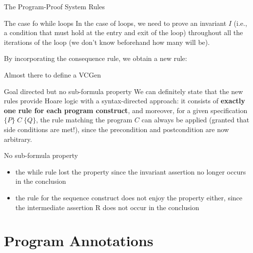 \documentclass[aspectratio=169]{beamer}
\begin{document}
\begin{frame}[fragile]{The Program-Proof System Rules}
  \begin{block}{The case fo while loops}
  In the case of loops, we need to prove an invariant $I$ (i.e., a condition that must hold at the entry and exit of the loop) throughout all the iterations of the loop (we don't know beforehand how many will be). 
    \begin{prooftree}
    \end{prooftree}
    By incorporating the consequence rule, we obtain a new rule:
    \begin{prooftree}
    \end{prooftree}
  \end{block}
\end{frame}

\begin{slide}{Almost there to define a VCGen}
  \begin{block}{Goal directed but no sub-formula property}
    We can definitely state that the new rules provide Hoare logic with a syntax-directed approach: it consists of \textbf{exactly one rule for each program construct}, and moreover, for a given specification $\{P\}\;C\;\{Q\}$, the rule matching the program $C$ can always be applied (granted that side conditions are met!), since the precondition and postcondition are now arbitrary.
  \end{block}
  
  \begin{alertblock}{No sub-formula property}
    \begin{itemize}
    \item the while rule lost the property since the invariant assertion no longer occurs in the conclusion
    \item the rule for the sequence construct does not enjoy the property either, since the intermediate assertion R does not occur in the conclusion  
    \end{itemize}
  \end{alertblock}
\end{slide}

\section*{Program Annotations}
\end{document}
